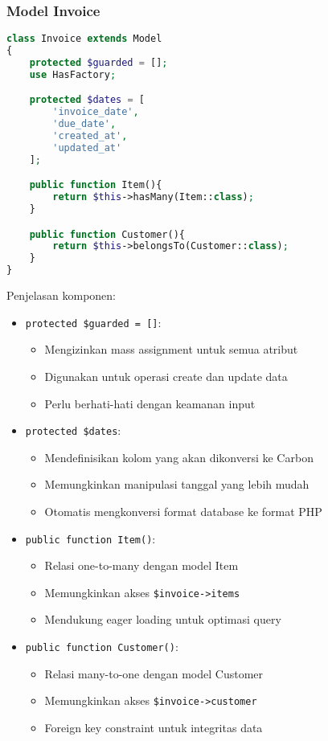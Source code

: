 \documentclass[a4paper]{report}
\begin{document}
\subsubsection{Model Invoice}
\begin{lstlisting}[language=PHP]
class Invoice extends Model
{
    protected $guarded = [];
    use HasFactory;

    protected $dates = [
        'invoice_date',
        'due_date',
        'created_at',
        'updated_at'
    ];

    public function Item(){
        return $this->hasMany(Item::class);
    }

    public function Customer(){
        return $this->belongsTo(Customer::class);
    }
}
\end{lstlisting}

Penjelasan komponen:
\begin{itemize}
\item \texttt{protected \$guarded = []}: 
    \begin{itemize}
    \item Mengizinkan mass assignment untuk semua atribut
    \item Digunakan untuk operasi create dan update data
    \item Perlu berhati-hati dengan keamanan input
    \end{itemize}

\item \texttt{protected \$dates}:
    \begin{itemize}
    \item Mendefinisikan kolom yang akan dikonversi ke Carbon
    \item Memungkinkan manipulasi tanggal yang lebih mudah
    \item Otomatis mengkonversi format database ke format PHP
    \end{itemize}

\item \texttt{public function Item()}:
    \begin{itemize}
    \item Relasi one-to-many dengan model Item
    \item Memungkinkan akses \texttt{\$invoice->items}
    \item Mendukung eager loading untuk optimasi query
    \end{itemize}

\item \texttt{public function Customer()}:
    \begin{itemize}
    \item Relasi many-to-one dengan model Customer
    \item Memungkinkan akses \texttt{\$invoice->customer}
    \item Foreign key constraint untuk integritas data
    \end{itemize}
\end{itemize}
\end{document}
